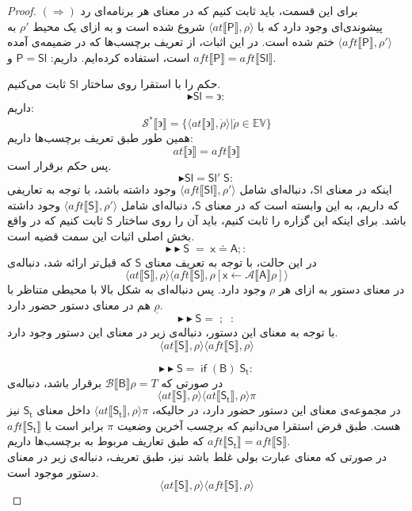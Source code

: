 \begin{proof}
	$(\Rightarrow)$
	برای این قسمت، باید ثابت کنیم که در معنای هر برنامه‌ای رد پیشوندی‌ای وجود دارد که با
	$\langle at\llbracket \mathsf{P} \rrbracket , \rho \rangle$
	شروع شده است و به ازای یک محیط $\rho'$ به 
	$\langle aft\llbracket \mathsf{P} \rrbracket , \rho' \rangle$
	ختم شده است. 
	در این اثبات، از تعریف برچسب‌ها که در ضمیمه‌ی \cite{calcul} آمده است، استفاده کرده‌ایم.
	داریم:
	$\mathsf{P=Sl}$
	و 
	$aft \llbracket \mathsf{P} \rrbracket = aft \llbracket \mathsf{Sl} \rrbracket $.
	
	حکم را با استقرا روی ساختار $\mathsf{Sl}$ ثابت می‌کنیم. 
	$$\blacktriangleright \mathsf{Sl = \backepsilon}:$$
	داریم:
	$$\mathcal{S^*} \llbracket \backepsilon \rrbracket = \{\langle at \llbracket \backepsilon \rrbracket , \dot{\rho} \rangle | \dot{\rho} \in \mathbb{EV}\}$$
	همین طور طبق تعریف برچسب‌ها داریم:
	$$at \llbracket \backepsilon \rrbracket = aft \llbracket \backepsilon \rrbracket$$
	پس حکم برقرار است.
	$$\blacktriangleright \mathsf{Sl =Sl'\;S}:$$
	اینکه در معنای $\mathsf{Sl}$، دنباله‌ای شامل
	 $\langle aft \llbracket \mathsf{Sl} \rrbracket , \rho '\rangle$ وجود داشته باشد، با توجه به تعاریفی که داریم، به این وابسته است که در معنای
	  $\mathsf{S}$،
	   دنباله‌ای شامل $\langle aft \llbracket \mathsf{S} \rrbracket , \rho' \rangle$ وجود داشته باشد. برای اینکه این گزاره را ثابت کنیم، باید آن را روی ساختار $\mathsf{S}$ ثابت کنیم که در واقع بخش اصلی اثبات این سمت قضیه است. 
	$$\blacktriangleright\blacktriangleright \mathsf{S\;=\; x\doteq A;}:$$
	در این حالت، با توجه به تعریف معنای $\mathsf{S}$ که قبل‌تر ارائه شد، دنباله‌ی 
	$$\langle at \llbracket \mathsf{S} \rrbracket ,\rho \rangle \langle aft\llbracket\mathsf{S}\rrbracket , \rho[\mathsf{x}\leftarrow \mathcal{A}\llbracket\mathsf{A}\rrbracket\rho] \rangle $$
	در معنای دستور به ازای هر $\rho$ وجود دارد. پس دنباله‌ای به شکل بالا با محیطی متناظر با
	$\underline{\rho}$
	هم در معنای دستور حضور دارد.
	$$\blacktriangleright\blacktriangleright \mathsf{S=\; ; \;\;}:$$	 
با توجه به معنای این دستور، دنباله‌ی زیر در معنای این دستور وجود دارد.
$$\langle at \llbracket \mathsf{S} \rrbracket ,\rho \rangle \langle aft\llbracket\mathsf{S}\rrbracket , \rho \rangle $$

$$\blacktriangleright\blacktriangleright \mathsf{S=\; if\;(B)\;S_t}:$$
	در صورتی که 
	$\mathcal{B}\llbracket\mathsf{B}\rrbracket\rho=\mathit{T}$
	برقرار باشد، دنباله‌ی 
	$$\langle at \llbracket \mathsf{S} \rrbracket , \rho \rangle
	\langle at \llbracket \mathsf{S_t} \rrbracket , \rho \rangle \pi$$
	در مجموعه‌ی معنای این دستور حضور دارد، در حالیکه، 
	$\langle at \llbracket \mathsf{S_t} \rrbracket , \rho \rangle \pi$
	داخل معنای $\mathsf{S_t}$ نیز هست. طبق فرض استقرا می‌دانیم که برچسب آخرین وضعیت $\pi$ برابر است با $aft \llbracket \mathsf{S_t} \rrbracket$ که طبق تعاریف مربوط به برچسب‌ها داریم
	$aft \llbracket \mathsf{S_t} \rrbracket=aft \llbracket \mathsf{S} \rrbracket$.\\
	در صورتی که معنای عبارت بولی غلط باشد نیز، طبق تعریف، دنباله‌ی زیر در معنای دستور موجود است.
	$$\langle at \llbracket \mathsf{S} \rrbracket ,\rho \rangle \langle aft\llbracket\mathsf{S}\rrbracket , \rho \rangle $$
	

\end{proof}
